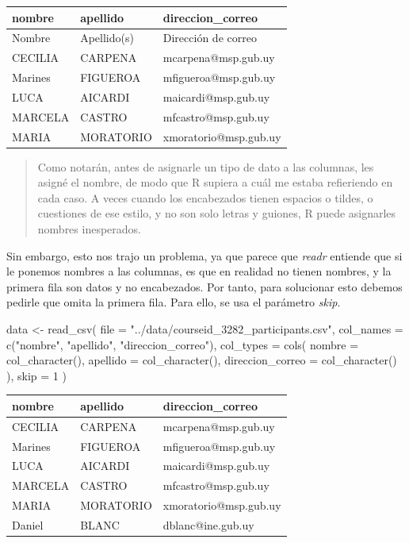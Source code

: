 \documentclass[
  letterpaper,
  DIV=11,
  numbers=noendperiod]{scrreprt}
\newenvironment{Shaded}{\begin{snugshade}}{\end{snugshade}}
\newcommand{\AttributeTok}[1]{\textcolor[rgb]{0.40,0.45,0.13}{#1}}
\newcommand{\DecValTok}[1]{\textcolor[rgb]{0.68,0.00,0.00}{#1}}
\newcommand{\FunctionTok}[1]{\textcolor[rgb]{0.28,0.35,0.67}{#1}}
\newcommand{\NormalTok}[1]{\textcolor[rgb]{0.00,0.23,0.31}{#1}}
\newcommand{\OtherTok}[1]{\textcolor[rgb]{0.00,0.23,0.31}{#1}}
\newcommand{\StringTok}[1]{\textcolor[rgb]{0.13,0.47,0.30}{#1}}
\begin{document}
\begin{longtable}[]{@{}lll@{}}
\toprule()
nombre & apellido & direccion\_correo \\
\midrule()
\endhead
Nombre & Apellido(s) & Dirección de correo \\
CECILIA & CARPENA & mcarpena@msp.gub.uy \\
Marines & FIGUEROA & mfigueroa@msp.gub.uy \\
LUCA & AICARDI & maicardi@msp.gub.uy \\
MARCELA & CASTRO & mfcastro@msp.gub.uy \\
MARIA & MORATORIO & xmoratorio@msp.gub.uy \\
\bottomrule()
\end{longtable}

\begin{quote}
Como notarán, antes de asignarle un tipo de dato a las columnas, les
asigné el nombre, de modo que R supiera a cuál me estaba refieriendo en
cada caso. A veces cuando los encabezados tienen espacios o tildes, o
cuestiones de ese estilo, y no son solo letras y guiones, R puede
asignarles nombres inesperados.
\end{quote}

Sin embargo, esto nos trajo un problema, ya que parece que \emph{readr}
entiende que si le ponemos nombres a las columnas, es que en realidad no
tienen nombres, y la primera fila son datos y no encabezados. Por tanto,
para solucionar esto debemos pedirle que omita la primera fila. Para
ello, se usa el parámetro \emph{skip}.

\begin{Shaded}
\begin{Highlighting}[]
\NormalTok{data }\OtherTok{\textless{}{-}} \FunctionTok{read\_csv}\NormalTok{(}
  \AttributeTok{file =} \StringTok{"../data/courseid\_3282\_participants.csv"}\NormalTok{,}
  \AttributeTok{col\_names =} \FunctionTok{c}\NormalTok{(}\StringTok{"nombre"}\NormalTok{, }\StringTok{"apellido"}\NormalTok{, }\StringTok{"direccion\_correo"}\NormalTok{),}
  \AttributeTok{col\_types =} \FunctionTok{cols}\NormalTok{(}
    \AttributeTok{nombre =} \FunctionTok{col\_character}\NormalTok{(),}
    \AttributeTok{apellido =} \FunctionTok{col\_character}\NormalTok{(),}
    \AttributeTok{direccion\_correo =} \FunctionTok{col\_character}\NormalTok{()}
\NormalTok{  ),}
  \AttributeTok{skip =} \DecValTok{1}
\NormalTok{)}
\end{Highlighting}
\end{Shaded}

\begin{longtable}[]{@{}lll@{}}
\toprule()
nombre & apellido & direccion\_correo \\
\midrule()
\endhead
CECILIA & CARPENA & mcarpena@msp.gub.uy \\
Marines & FIGUEROA & mfigueroa@msp.gub.uy \\
LUCA & AICARDI & maicardi@msp.gub.uy \\
MARCELA & CASTRO & mfcastro@msp.gub.uy \\
MARIA & MORATORIO & xmoratorio@msp.gub.uy \\
Daniel & BLANC & dblanc@ine.gub.uy \\
\bottomrule()
\end{longtable}
\end{document}
